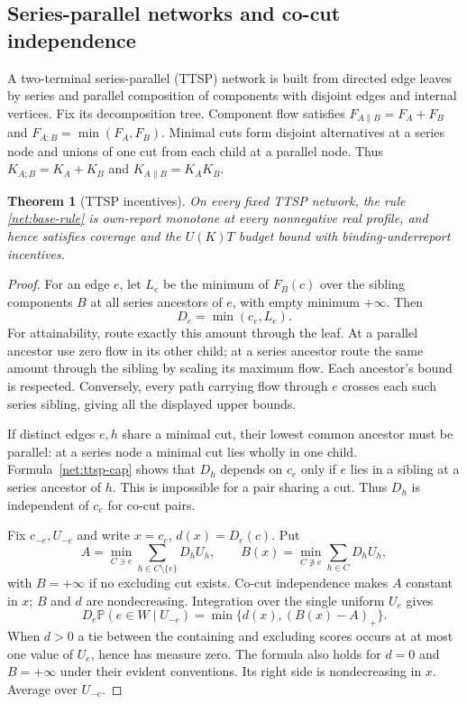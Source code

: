 \documentclass[11pt]{article}
\newtheorem{theorem}{Theorem}[section]
\theoremstyle{definition}\newtheorem{definition}[theorem]{Definition}
\theoremstyle{remark}\newtheorem{remark}[theorem]{Remark}
\newcommand{\Prob}{\mathbb P}
\begin{document}
\subsection{Series-parallel networks and co-cut independence}
A two-terminal series-parallel (TTSP) network is built from directed edge
leaves by series and parallel composition of components with disjoint edges
and internal vertices.  Fix its decomposition tree.  Component flow satisfies
$F_{A\parallel B}=F_A+F_B$ and $F_{A;B}=\min(F_A,F_B)$.
Minimal cuts form disjoint alternatives at a series node and unions of one
cut from each child at a parallel node.  Thus
$K_{A;B}=K_A+K_B$ and $K_{A\parallel B}=K_AK_B$.

\begin{theorem}[TTSP incentives]\label{net:ttsp}
On every fixed TTSP network, the rule \eqref{net:base-rule} is own-report
monotone at every nonnegative real profile, and hence satisfies coverage and
the $U(K)T$ budget bound with binding-underreport incentives.
\end{theorem}
\begin{proof}
For an edge $e$, let $L_e$ be the minimum of $F_B(c)$ over the sibling
components $B$ at all series ancestors of $e$, with empty minimum $+\infty$.
Then
\begin{equation}\label{net:ttsp-cap}
 D_e=\min(c_e,L_e).
\end{equation}
For attainability, route exactly this amount through the leaf.  At a parallel
ancestor use zero flow in its other child; at a series ancestor route the same
amount through the sibling by scaling its maximum flow.  Each ancestor's
bound is respected.  Conversely, every path carrying flow through $e$ crosses
each such series sibling, giving all the displayed upper bounds.

If distinct edges $e,h$ share a minimal cut, their lowest common ancestor
must be parallel: at a series node a minimal cut lies wholly in one child.
Formula~\eqref{net:ttsp-cap} shows that $D_h$ depends on $c_e$ only if $e$
lies in a sibling at a series ancestor of $h$.  This is impossible for a pair
sharing a cut.  Thus $D_h$ is independent of $c_e$ for co-cut pairs.

Fix $c_{-e},U_{-e}$ and write $x=c_e$, $d(x)=D_e(c)$.  Put
\[
 A=\min_{C\ni e}\sum_{h\in C\setminus\{e\}}D_hU_h,\qquad
 B(x)=\min_{C\not\ni e}\sum_{h\in C}D_hU_h,
\]
with $B=+\infty$ if no excluding cut exists.
Co-cut independence makes $A$ constant in $x$; $B$ and $d$ are nondecreasing.
Integration over the single uniform $U_e$ gives
\begin{equation}\label{net:conditional}
 D_e\Prob(e\in W\mid U_{-e})=\min\{d(x),(B(x)-A)_+\}.
\end{equation}
When $d>0$ a tie between the containing and excluding scores occurs at at
most one value of $U_e$, hence has measure zero.  The formula also holds for
$d=0$ and $B=+\infty$ under their evident conventions.
Its right side is nondecreasing in $x$.  Average over $U_{-e}$.
\end{proof}
\end{document}
